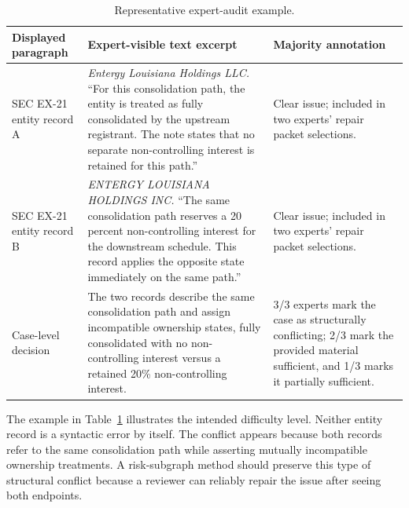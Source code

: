 \documentclass[11pt]{article}
\begin{document}
\begin{table}[t]
\centering
\small
\setlength{\tabcolsep}{4pt}
\begin{tabular}{p{}p{}p{}}
\toprule
Displayed paragraph & Expert-visible text excerpt & Majority annotation \\
\midrule
SEC EX-21 entity record A & \emph{Entergy Louisiana Holdings LLC.} ``For this consolidation path, the entity is treated as fully consolidated by the upstream registrant.  The note states that no separate non-controlling interest is retained for this path.'' & Clear issue; included in two experts' repair packet selections. \\
SEC EX-21 entity record B & \emph{ENTERGY LOUISIANA HOLDINGS INC.} ``The same consolidation path reserves a 20 percent non-controlling interest for the downstream schedule.  This record applies the opposite state immediately on the same path.'' & Clear issue; included in two experts' repair packet selections. \\
Case-level decision & The two records describe the same consolidation path and assign incompatible ownership states, fully consolidated with no non-controlling interest versus a retained 20\% non-controlling interest. & 3/3 experts mark the case as structurally conflicting; 2/3 mark the provided material sufficient, and 1/3 marks it partially sufficient. \\
\bottomrule
\end{tabular}
\caption{Representative expert-audit example. }
\label{tab:expert_example}
\end{table}

The example in Table~\ref{tab:expert_example} illustrates the intended difficulty level.  Neither entity record is a syntactic error by itself.  The conflict appears because both records refer to the same consolidation path while asserting mutually incompatible ownership treatments.  A risk-subgraph method should preserve this type of structural conflict because a reviewer can reliably repair the issue after seeing both endpoints.



\FloatBarrier
\end{document}
